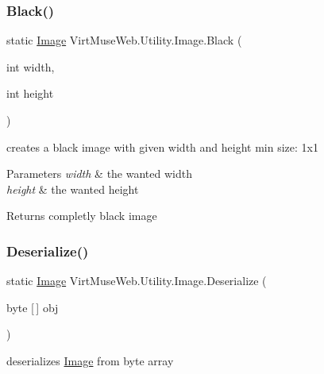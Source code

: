 \subsubsection{\texorpdfstring{Black()}{Black()}}
{\footnotesize\ttfamily static \mbox{\hyperlink{class_virt_muse_web_1_1_utility_1_1_image}{Image}} Virt\+Muse\+Web.\+Utility.\+Image.\+Black (\begin{DoxyParamCaption}\item[{int}]{width,  }\item[{int}]{height }\end{DoxyParamCaption})\hspace{0.3cm}{\ttfamily [static]}}



creates a black image with given width and height min size\+: 1x1 


\begin{DoxyParams}{Parameters}
{\em width} & the wanted width\\
\hline
{\em height} & the wanted height\\
\hline
\end{DoxyParams}
\begin{DoxyReturn}{Returns}
completly black image
\end{DoxyReturn}
\mbox{\label{class_virt_muse_web_1_1_utility_1_1_image_ab45d281959b7e4d99408631f57f1d372}} 
\subsubsection{\texorpdfstring{Deserialize()}{Deserialize()}\hspace{0.1cm}{\footnotesize\ttfamily [1/2]}}
{\footnotesize\ttfamily static \mbox{\hyperlink{class_virt_muse_web_1_1_utility_1_1_image}{Image}} Virt\+Muse\+Web.\+Utility.\+Image.\+Deserialize (\begin{DoxyParamCaption}\item[{byte \mbox{[}$\,$\mbox{]}}]{obj }\end{DoxyParamCaption})\hspace{0.3cm}{\ttfamily [static]}}



deserializes \mbox{\hyperlink{class_virt_muse_web_1_1_utility_1_1_image}{Image}} from byte array 


